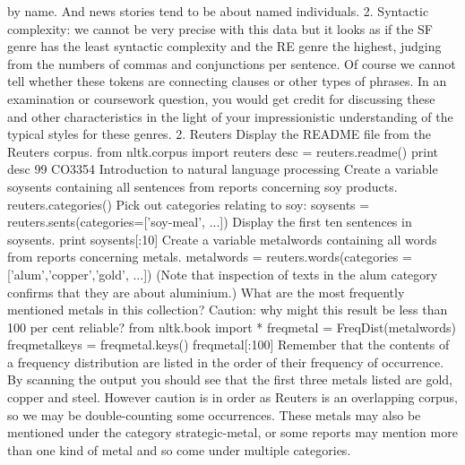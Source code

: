 by name. And news stories tend to be about named individuals.
2. Syntactic complexity: we cannot be very precise with this data but it looks as if
the SF genre has the least syntactic complexity and the RE genre the highest,
judging from the numbers of commas and conjunctions per sentence. Of course
we cannot tell whether these tokens are connecting clauses or other types of
phrases.
In an examination or coursework question, you would get credit for discussing these
and other characteristics in the light of your impressionistic understanding of the
typical styles for these genres.
2. Reuters
Display the README file from the Reuters corpus.
from nltk.corpus import reuters
desc = reuters.readme()
print desc
99
CO3354 Introduction to natural language processing
Create a variable soysents containing all sentences from reports concerning soy
products.
reuters.categories()
Pick out categories relating to soy:
soysents = reuters.sents(categories=['soy-meal', ...])
Display the first ten sentences in soysents.
print soysents[:10]
Create a variable metalwords containing all words from reports concerning
metals.
metalwords = reuters.words(categories = ['alum','copper','gold', ...])
(Note that inspection of texts in the alum category confirms that they are about
aluminium.)
What are the most frequently mentioned metals in this collection? Caution: why
might this result be less than 100 per cent reliable?
from nltk.book import *
freqmetal = FreqDist(metalwords)
freqmetalkeys = freqmetal.keys()
freqmetal[:100]
Remember that the contents of a frequency distribution are listed in the order of
their frequency of occurrence. By scanning the output you should see that the
first three metals listed are gold, copper and steel. However caution is in order
as Reuters is an overlapping corpus, so we may be double-counting some
occurrences. These metals may also be mentioned under the category
strategic-metal, or some reports may mention more than one kind of metal
and so come under multiple categories.

